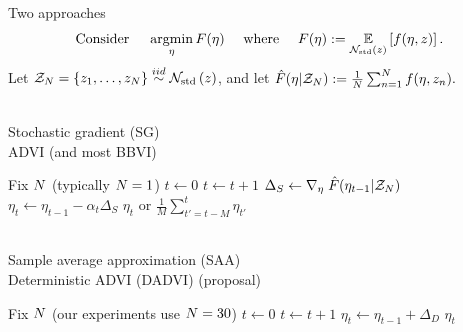 \documentclass[8pt]{beamer}\usepackage[]{graphicx}\usepackage[]{color}
\begin{document}
\begin{frame}{Two approaches}
%
%
\vspace{-1em}
\begin{align*}
%
\text{Consider }\quad
\argmin_{\eta} F(\eta)
\quad\text{ where } \quad F(\eta) := \expect{\normz}{f(\eta, \z)}.
%
\end{align*}
%
Let $\mathcal{Z}_{N} = \{z_1, \ldots, z_N \} \overset{iid}{\sim} \mathcal{N}_{\mathrm{std}}\left(z\right)$, and let
%
%
$
\hat{F}(\eta | \mathcal{Z}_{N}) := \frac{1}{N}\sum_{n=1}^{N} f(\eta, z_n).
$
%
%
%
\begin{minipage}{1.0\linewidth}
    \begin{minipage}[t]{0.49\linewidth}
        \begin{algorithm}[H]
        \caption{\\Stochastic gradient (SG)\\ADVI (and most BBVI)}\label{alg:sadvi}
        \begin{algorithmic}
        \State Fix $N$ (typically $N = 1$)
        \State $t \gets 0$
                \State $t \gets t + 1$
                \State $\Delta_S \gets \nabla_{\eta} \left. \hat{F}(\eta_{t-1} | \mathcal{Z}_{N}) \right.$
                \State $\eta_t \gets \eta_{t-1} - \alpha_t \Delta_S$
            \EndWhile
            \State \Return 
            $\eta_t$ or
                $\frac{1}{M} \sum_{t'=t- M}^t \eta_{t'}$
        \end{algorithmic}
        \end{algorithm}
    \end{minipage}
    \begin{minipage}[t]{0.49\linewidth}
        \begin{algorithm}[H]
        \caption{\\Sample average approximation (SAA)\\Deterministic ADVI (DADVI) (proposal)}
        \label{alg:dadvi}
        \begin{algorithmic}
            \State Fix $N$ (our experiments use $N = 30$)
            \State {}
            \State $t \gets 0$
                \State $t \gets t + 1$
                \State
                \State $\eta_t \gets \eta_{t-1} + \Delta_D$
                \State {}
            \EndWhile
            \State \Return $\eta_t$
        \end{algorithmic}
        \end{algorithm}
    \end{minipage}
\end{minipage}


\end{frame}
\end{document}
